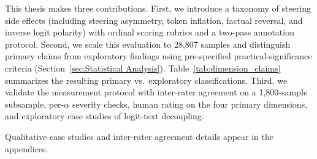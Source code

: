 This thesis makes three contributions.
First, we introduce a taxonomy of steering side effects (including steering asymmetry, token inflation, factual reversal, and inverse logit polarity) with ordinal scoring rubrics and a two-pass annotation protocol.
Second, we scale this evaluation to 28{,}807 samples and distinguish primary claims from exploratory findings using pre-specified practical-significance criteria (Section~\ref{sec:Statistical Analysis}).
Table~\ref{tab:dimension_claims} summarizes the resulting primary vs.\ exploratory classifications.
Third, we validate the measurement protocol with inter-rater agreement on a 1{,}800-sample subsample, per-$\alpha$ severity checks, human rating on the four primary dimensions, and exploratory case studies of logit-text decoupling.

Qualitative case studies and inter-rater agreement details appear in the appendices.
